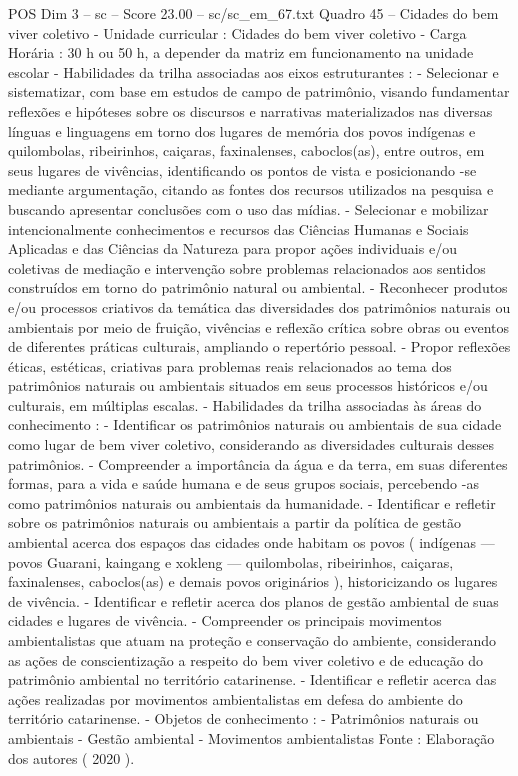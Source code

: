 \begin{textsample}{POS Dim 3 – sc – Score 23.00 – sc/sc\_em\_67.txt}
Quadro 45 – Cidades do bem viver coletivo - Unidade curricular : Cidades do bem viver coletivo - Carga Horária : 30 h ou 50 h, a depender da matriz em funcionamento na unidade escolar - Habilidades da trilha associadas aos eixos estruturantes : - Selecionar e sistematizar, com base em estudos de campo de patrimônio, visando fundamentar reflexões e hipóteses sobre os discursos e narrativas materializados nas diversas línguas e linguagens em torno dos lugares de memória dos povos indígenas e quilombolas, ribeirinhos, caiçaras, faxinalenses, caboclos(as), entre outros, em seus lugares de vivências, identificando os pontos de vista e posicionando -se mediante argumentação, citando as fontes dos recursos utilizados na pesquisa e buscando apresentar conclusões com o uso das mídias. - Selecionar e mobilizar intencionalmente conhecimentos e recursos das Ciências Humanas e Sociais Aplicadas e das Ciências da Natureza para propor ações individuais e/ou coletivas de mediação e intervenção sobre problemas relacionados aos sentidos construídos em torno do patrimônio natural ou ambiental. - Reconhecer produtos e/ou processos criativos da temática das diversidades dos patrimônios naturais ou ambientais por meio de fruição, vivências e reflexão crítica sobre obras ou eventos de diferentes práticas culturais, ampliando o repertório pessoal. - Propor reflexões éticas, estéticas, criativas para problemas reais relacionados ao tema dos patrimônios naturais ou ambientais situados em seus processos históricos e/ou culturais, em múltiplas escalas. - Habilidades da trilha associadas às áreas do conhecimento : - Identificar os patrimônios naturais ou ambientais de sua cidade como lugar de bem viver coletivo, considerando as diversidades culturais desses patrimônios. - Compreender a importância da água e da terra, em suas diferentes formas, para a vida e saúde humana e de seus grupos sociais, percebendo -as como patrimônios naturais ou ambientais da humanidade. - Identificar e refletir sobre os patrimônios naturais ou ambientais a partir da política de gestão ambiental acerca dos espaços das cidades onde habitam os povos ( indígenas — povos Guarani, kaingang e xokleng — quilombolas, ribeirinhos, caiçaras, faxinalenses, caboclos(as) e demais povos originários ), historicizando os lugares de vivência. - Identificar e refletir acerca dos planos de gestão ambiental de suas cidades e lugares de vivência. - Compreender os principais movimentos ambientalistas que atuam na proteção e conservação do ambiente, considerando as ações de conscientização a respeito do bem viver coletivo e de educação do patrimônio ambiental no território catarinense. - Identificar e refletir acerca das ações realizadas por movimentos ambientalistas em defesa do ambiente do território catarinense. - Objetos de conhecimento : - Patrimônios naturais ou ambientais - Gestão ambiental - Movimentos ambientalistas Fonte : Elaboração dos autores ( 2020 ).

\end{textsample}
